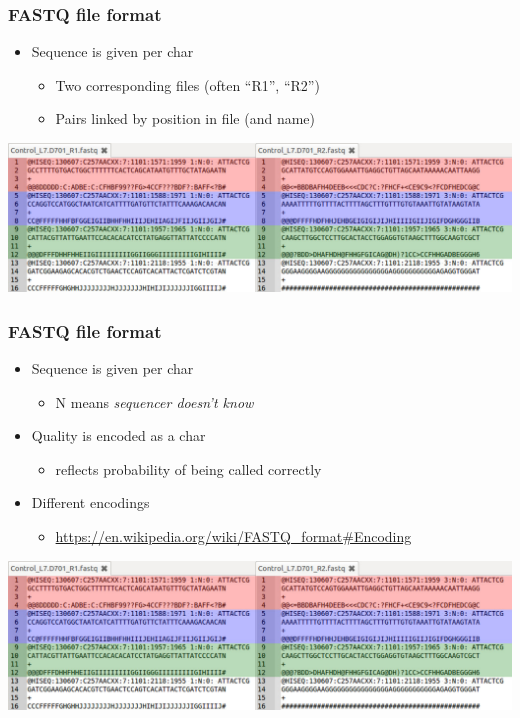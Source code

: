 \documentclass{beamer}			  %
\begin{document}
\begin{frame}
	\frametitle{FASTQ file format}
	\begin{itemize}
		\item Sequence is given per char
		\begin{itemize}
			\item Two corresponding files (often ``R1”, ``R2”)
			\item Pairs linked by position in file (and name)
		\end{itemize}
	\end{itemize}
	\begin{center}
		\includegraphics[width=\textwidth]{figures/dge_03bp.png}
	\end{center}
\end{frame}

\begin{frame}
	\frametitle{FASTQ file format}
	\begin{itemize}
		\item Sequence is given per char
		\begin{itemize}
			\item N means \textit{sequencer doesn’t know}
		\end{itemize}
		\item Quality is encoded as a char
		\begin{itemize}
			\item reflects probability of being called correctly
		\end{itemize}
		\item Different encodings
		\begin{itemize}
			\item {\scriptsize \url{https://en.wikipedia.org/wiki/FASTQ\_format\#Encoding}}
		\end{itemize}
	\end{itemize}
	\begin{center}
		\includegraphics[width=\textwidth]{figures/dge_03bp.png}
	\end{center}
\end{frame}
\end{document}
